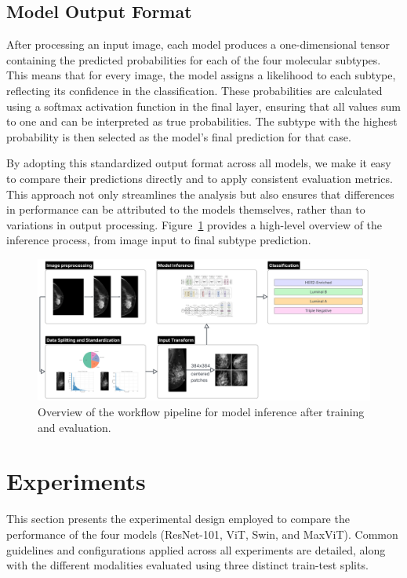 \documentclass[a4paper,10pt]{book}
\begin{document}
\subsection{Model Output Format}

After processing an input image, each model produces a one-dimensional tensor containing the predicted probabilities for each of the four molecular subtypes. This means that for every image, the model assigns a likelihood to each subtype, reflecting its confidence in the classification. These probabilities are calculated using a softmax activation function in the final layer, ensuring that all values sum to one and can be interpreted as true probabilities. The subtype with the highest probability is then selected as the model’s final prediction for that case.

By adopting this standardized output format across all models, we make it easy to compare their predictions directly and to apply consistent evaluation metrics. This approach not only streamlines the analysis but also ensures that differences in performance can be attributed to the models themselves, rather than to variations in output processing. Figure~\ref{fig:flowchart} provides a high-level overview of the inference process, from image input to final subtype prediction.

\begin{figure}[h!]
    \centering
    \includegraphics[width=0.9\linewidth]{reports//assets/Flowchart.png}
    \caption[Workflow pipeline]{Overview of the workflow pipeline for model inference after training and evaluation.}
    \label{fig:flowchart}
\end{figure}

\section{Experiments}

This section presents the experimental design employed to compare the performance of the four models (ResNet-101, ViT, Swin, and MaxViT). Common guidelines and configurations applied across all experiments are detailed, along with the different modalities evaluated using three distinct train-test splits.
\end{document}
